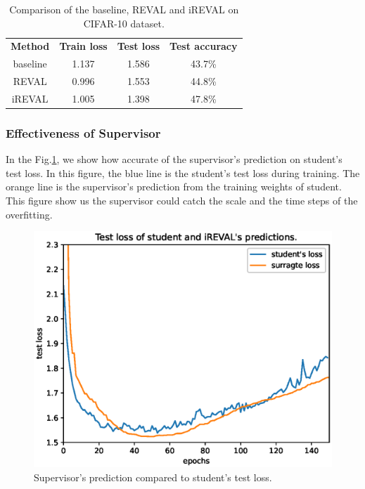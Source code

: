 \documentclass[english]{sobraep}
\begin{document}
\begin{table}[H]
	\centering
	\begin{tabular}{cccc}
		\toprule [1.3pt]	
		\hline
		\multirow{2}{1.1cm}{\centering \textbf{Method}} & \multirow{2}{*}{\textbf{Train loss}} &
		\multirow{2}{*}{\textbf{Test loss}} & \multirow{2}{*}{\textbf{Test accuracy}} \\
		&  &  & \\		
		\hline
		baseline & 1.137 & 1.586 & 43.7\% \\
		\hline
		REVAL &  0.996  & 1.553 &  44.8\%\\
		\hline
		iREVAL &  1.005  & 1.398 & 47.8\%\\
		\hline
		\bottomrule[1.3pt]
	\end{tabular}
	\caption{Comparison of the baseline, REVAL and iREVAL on CIFAR-10 dataset.}
	\label{table:test_loss_students}
\end{table}


\subsubsection{Effectiveness of Supervisor}
In the Fig.\ref{fig:vloss_sloss}, we show how accurate of the supervisor's prediction on student's test loss. In this figure, the blue line is the student's test loss during training. The orange line is the supervisor's prediction from the training weights of student. This figure show us the supervisor could catch the scale and the time steps of the overfitting.

\begin{figure}
    \centering
    \captionsetup{justification=centering}
    \includegraphics[scale=0.5]{Figures/CIFAR10/sp_st_surrogate_loss.eps}
    \caption{Supervisor's prediction compared to student's test loss.}
    \label{fig:vloss_sloss}
\end{figure}
\end{document}
